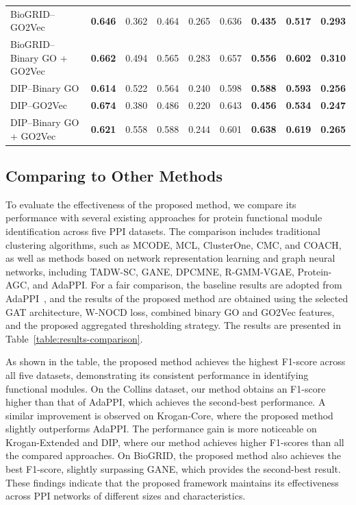 \begin{table}[t]
{\begin{tabular}{l|cccc|cccc}
			BioGRID--GO2Vec
			& \textbf{0.646} & 0.362 & 0.464 & 0.265
			& 0.636 & \textbf{0.435} & \textbf{0.517} & \textbf{0.293} \\
			
			BioGRID--Binary GO + GO2Vec
			& \textbf{0.662} & 0.494 & 0.565 & 0.283
			& 0.657 & \textbf{0.556} & \textbf{0.602} & \textbf{0.310} \\
			\midrule
			DIP--Binary GO
			& \textbf{0.614} & 0.522 & 0.564 & 0.240
			& 0.598 & \textbf{0.588} & \textbf{0.593} & \textbf{0.256} \\
			
			DIP--GO2Vec
			& \textbf{0.674} & 0.380 & 0.486 & 0.220
			& 0.643 & \textbf{0.456} & \textbf{0.534} & \textbf{0.247} \\
			
			DIP--Binary GO + GO2Vec
			& \textbf{0.621} & 0.558 & 0.588 & 0.244
			& 0.601 & \textbf{0.638} & \textbf{0.619} & \textbf{0.265} \\
			\bottomrule
		\end{tabular}
	}
\end{table}

\subsection{Comparing to Other Methods}

To evaluate the effectiveness of the proposed method, we compare its performance with several existing approaches for protein functional module identification across five PPI datasets. The comparison includes traditional clustering algorithms, such as MCODE, MCL, ClusterOne, CMC, and COACH, as well as methods based on network representation learning and graph neural networks, including TADW-SC, GANE, DPCMNE, R-GMM-VGAE, Protein-AGC, and AdaPPI. For a fair comparison, the baseline results are adopted from AdaPPI~\cite{adappi}, and the results of the proposed method are obtained using the selected GAT architecture, W-NOCD loss, combined binary GO and GO2Vec features, and the proposed aggregated thresholding strategy. The results are presented in Table~\ref{table:results-comparison}.

As shown in the table, the proposed method achieves the highest F1-score across all five datasets, demonstrating its consistent performance in identifying functional modules. On the Collins dataset, our method obtains an F1-score higher than that of AdaPPI, which achieves the second-best performance. A similar improvement is observed on Krogan-Core, where the proposed method slightly outperforms AdaPPI. The performance gain is more noticeable on Krogan-Extended and DIP, where our method achieves higher F1-scores than all the compared approaches. On BioGRID, the proposed method also achieves the best F1-score, slightly surpassing GANE, which provides the second-best result. These findings indicate that the proposed framework maintains its effectiveness across PPI networks of different sizes and characteristics.

